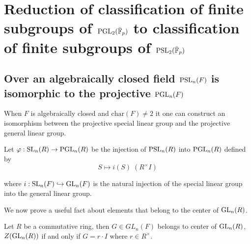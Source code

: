 \chapter{Reduction of classification of finite subgroups of $\operatorname{PGL}_2(\bar{\mathbb{F}}_p)$ to classification of finite subgroups of $\operatorname{PSL}_2(\bar{\mathbb{F}}_p)$}\label{Ch4_ReductionOfProblem}

\section{Over an algebraically closed field $\operatorname{PSL}_n(F)$ is isomorphic to the projective $\operatorname{PGL}_n(F)$}


When $F$ is algebraically closed and $\textrm{char}(F) \neq 2$ it one can construct an isomorphism between 
the projective special linear group and the projective general linear group.

\begin{definition}
\label{SL_monoidHom_PGL}
\leanok
    Let $\varphi : \operatorname{SL}_n(R) \rightarrow \operatorname{PGL}_n(R)$ be the injection of $\operatorname{PSL}_n(R)$ into $\operatorname{PGL}_n(R)$ defined by
    \[
     S \mapsto i(S) \;  (R^\times I) 
    \]

    where $i : \operatorname{SL}_n(F) \hookrightarrow \operatorname{GL}_n(F)$ is the natural injection of the special linear group into the general linear group.
\end{definition}



We now prove a useful fact about elements that belong to the center of $\operatorname{GL}_n(R)$.

\begin{lemma}
    \label{GeneralLinearGroup.mem_center_general_linear_group_iff}
    \leanok
     Let $R$ be a commutative ring, then $G \in GL_n(F)$ belongs to center of $\operatorname{GL}_n(R)$, $Z(\operatorname{GL}_n(R))$ if and only if $G = r \cdot I$ where $r \in R^\times$.
    \end{lemma}
    
